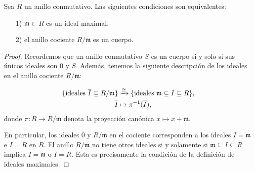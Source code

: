 \begin{proposicion}
  Sea $R$ un anillo conmutativo. Las siguientes condiciones son equivalentes:
  \begin{enumerate}
  \item[1)] $\mathfrak{m} \subset R$ es un ideal maximal,

  \item[2)] el anillo cociente $R/\mathfrak{m}$ es un cuerpo.
  \end{enumerate}

  \begin{proof}
    Recordemos que un anillo conmutativo $S$ es un cuerpo si y solo si sus
    únicos ideales son $0$ y $S$. Además, tenemos la siguiente descripción
    de los ideales en el anillo cociente $R/\mathfrak{m}$:

    \begin{align*}
      \{ \text{ideales }\overline{I} \subseteq R/\mathfrak{m} \} &
      \xrightarrow{\cong}
      \{ \text{ideales }\mathfrak{m} \subseteq I \subseteq R \},\\
      \overline{I} & \mapsto \pi^{-1} (\overline{I}),
    \end{align*}
    donde $\pi\colon R\to R/\mathfrak{m}$ denota la proyección canónica
    $x \mapsto x + \mathfrak{m}$.

    En particular, los ideales $\overline{0}$ y $R/\mathfrak{m}$ en el cociente
    corresponden a los ideales $I = \mathfrak{m}$ e $I = R$ en $R$. El anillo
    $R/\mathfrak{m}$ no tiene otros ideales si y solamente si
    $\mathfrak{m} \subseteq I \subseteq R$ implica $I = \mathfrak{m}$ o
    $I = R$. Esta es precisamente la condición de la definición de ideales
    maximales.
  \end{proof}
\end{proposicion}

